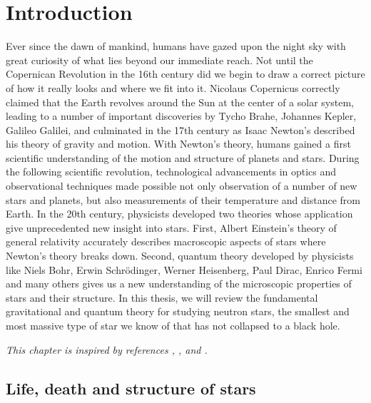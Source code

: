 \chapter{Introduction}
\label{chap:intro}


Ever since the dawn of mankind, humans have gazed upon the night sky with great curiosity of what lies beyond our immediate reach.
Not until the Copernican Revolution in the 16th century did we begin to draw a correct picture of how it really looks and where we fit into it.
Nicolaus Copernicus correctly claimed that the Earth revolves around the Sun at the center of a solar system, leading to a number of important discoveries by Tycho Brahe, Johannes Kepler, Galileo Galilei, and culminated in the 17th century as Isaac Newton's described his theory of gravity and motion.
With Newton's theory, humans gained a first scientific understanding of the motion and structure of planets and stars.
During the following scientific revolution, technological advancements in optics and observational techniques made possible not only observation of a number of new stars and planets, but also measurements of their temperature and distance from Earth.
In the 20th century, physicists developed two theories whose application give unprecedented new insight into stars.
First, Albert Einstein's theory of general relativity accurately describes macroscopic aspects of stars where Newton's theory breaks down.
Second, quantum theory developed by physicists like Niels Bohr, Erwin Schrödinger, Werner Heisenberg, Paul Dirac, Enrico Fermi and many others gives us a new understanding of the microscopic properties of stars and their structure.
In this thesis, we will review the fundamental gravitational and quantum theory for studying neutron stars, the smallest and most massive type of star we know of that has not collapsed to a black hole.

\textit{This chapter is inspired by references \cite{ref:glendenning}, \cite{ref:neutron_star_physics}, \cite{ref:lovelace_summary} and \cite{ref:neutron_star_wikipedia}.}

\section{Life, death and structure of stars}

